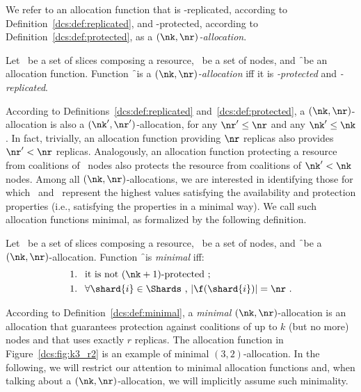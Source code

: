 We refer to an allocation function that is \nr-replicated, according
to Definition~\ref{dcs:def:replicated}, and \nk-protected, according to
Definition~\ref{dcs:def:protected}, as a {\em $(\nk,\nr)$-allocation\/}.

\smallskip
\begin{definition}
Let \Shards\ be a set of slices composing a resource, \Nodes\ be a set
of nodes, and \f\ be an allocation function. Function \f\ is a {\em
  $(\nk,\nr)$-allocation} iff it is {\em \nk-protected} and {\em
  \nr-replicated}.
\end{definition}
\smallskip

According to Definitions~\ref{dcs:def:replicated} and~\ref{dcs:def:protected},
a $(\nk,\nr)$-allocation is also a $(\nk',\nr')$-allocation, for any
$\nr'\leq\nr$ and any $\nk'\leq\nk$. In fact, trivially, an allocation
function providing $\nr$ replicas also provides $\nr'<\nr$
replicas. Analogously, an allocation function protecting a resource
from coalitions of \nk\ nodes also protects the resource from
coalitions of $\nk'<\nk$ nodes. Among all $(\nk,\nr)$-allocations, we
are interested in identifying those for which \nk\ and \nr\ represent
the highest values satisfying the availability and protection
properties (i.e.,  satisfying the
properties in a minimal way). We call such allocation functions
minimal, as formalized by the following definition.

\smallskip
\begin{definition}
Let \Shards\ be a set of slices composing a resource, \Nodes\ be a set of nodes, 
and \f\ be a $(\nk,\nr)$-allocation. Function \f\ is  {\em minimal\/} 
iff:
\begin{align*} 
    & \text{1. }\ \text{it is not } (\nk+1)\text{-protected}\ ; \\
    & \text{1. }\ \forall \shard{i} \in \Shards \text{ , } |\f(\shard{i})| = \nr\ .
\end{align*}
\end{definition}

\smallskip

According to Definition~\ref{dcs:def:minimal}, a {\em minimal\/}
$(\nk,\nr)$-allocation is an allocation that guarantees protection
against coalitions of up to $k$ (but no more) nodes and that uses
exactly $r$ replicas.  The allocation function in
Figure~\ref{dcs:fig:k3_r2} is an example of minimal $(3,2)$-allocation.
In the following, we will restrict our attention to minimal allocation
functions and, when talking about a $(\nk,\nr)$-allocation, we will
implicitly assume such minimality.





